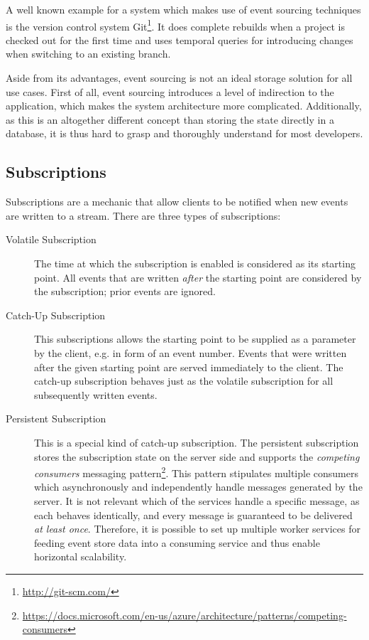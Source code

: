 A well known example for a system which makes use of event sourcing techniques is the version control system Git\footnote{\url{http://git-scm.com/}}.
It does complete rebuilds when a project is checked out for the first time and uses temporal queries for introducing changes when switching to an existing branch. 

Aside from its advantages, event sourcing is not an ideal storage solution for all use cases.
First of all, event sourcing introduces a level of indirection to the application, which makes the system architecture more complicated.
Additionally, as this is an altogether different concept than storing the state directly in a database, it is thus hard to grasp and thoroughly understand for most developers.



\cite{WEB:Fowler:2011}


\subsection{Subscriptions}

Subscriptions are a mechanic that allow clients to be notified when new events are written to a stream.
There are three types of subscriptions:

\begin{description}
\item[Volatile Subscription]
The time at which the subscription is enabled is considered as its starting point.
All events that are written \emph{after} the starting point are considered by the subscription; prior events are ignored.
\item[Catch-Up Subscription]
This subscriptions allows the starting point to be supplied as a parameter by the client, e.g. in form of an event number.
Events that were written after the given starting point are served immediately to the client.
The catch-up subscription behaves just as the volatile subscription for all subsequently written events.
\item[Persistent Subscription] 
This is a special kind of catch-up subscription.
The persistent subscription stores the subscription state on the server side and supports the \emph{competing consumers} messaging pattern\footnote{\url{https://docs.microsoft.com/en-us/azure/architecture/patterns/competing-consumers}}.
This pattern stipulates multiple consumers which asynchronously and independently handle messages generated by the server.
It is not relevant which of the services handle a specific message, as each behaves identically, and every message is guaranteed to be delivered \emph{at least once}.
Therefore, it is possible to set up multiple worker services for feeding event store data into a consuming service and thus enable horizontal scalability.
\end{description}


